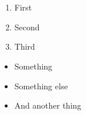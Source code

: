 \documentclass{article}
\title{}
\author{}
\date{}
\begin{document}
\maketitle

\section{}
\begin{enumerate}
	\item First
	\item Second
	\item Third
\end{enumerate}

\begin{itemize}
	\item Something
	\item Something else
	\item And another thing
\end{itemize}
\end{document}

